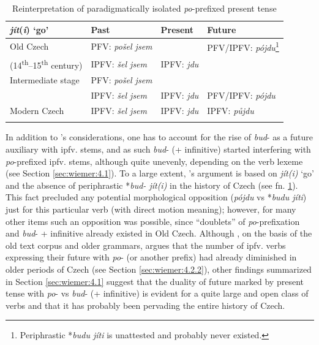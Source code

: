 \documentclass[output=paper,colorlinks,citecolor=brown]{langscibook}
\begin{document}
\begin{table}
\caption{Reinterpretation of paradigmatically isolated \textit{po}-prefixed present tense}
\label{tab:wiemer:2}
\begin{tabularx}{\textwidth}{p{3.1cm}Xp{1.9cm}p{3cm}}
\lsptoprule
\textit{jít}(\textit{i}) ‘go’ & {Past} & {Present} & {Future} \\
\midrule
Old Czech & PFV: \textit{pošel jsem} & \raisebox{3\height}{\rule{0.8cm}{0.25mm}} & PFV/IPFV: \textit{pójdu}\footnote{\label{fn:a} Periphrastic *\textit{budu jíti} is unattested and probably never existed.}\\
(14\textsuperscript{th}--15\textsuperscript{th} century) & IPFV: \textit{šel jsem} & IPFV: \textit{jdu} & \\
\midrule
{Intermediate stage} & PFV: \textit{pošel jsem} & \raisebox{3\height}{\rule{0.8cm}{0.25mm}} & \raisebox{3\height}{\rule{0.8cm}{0.25mm}}\\ 
& IPFV: \textit{šel jsem} & IPFV: \textit{jdu} & PFV/IPFV: \textit{pójdu}\\
\midrule
Modern Czech & IPFV: \textit{šel jsem} & IPFV: \textit{jdu} & IPFV: \textit{půjdu} \\
\lspbottomrule
\end{tabularx}
\end{table}


In addition to \citeauthor{Němec1958}’s considerations, one has to account for the rise of \textit{bud}- as a future auxiliary with ipfv. stems, and as such \textit{bud}- (+ infinitive) started interfering with \textit{po}-prefixed ipfv. stems, although quite unevenly, depending on the verb lexeme (see Section \ref{sec:wiemer:4.1}). To a large extent, \citeauthor{Němec1958}’s argument is based on \textit{jít(i)} ‘go’ and the absence of periphrastic *\textit{bud- jít(i)} in the history of Czech (see fn. \ref{fn:a}). This fact precluded any potential morphological opposition (\textit{pójdu} vs *\textit{budu jíti}) just for this particular verb (with direct motion meaning); however, for many other items such an opposition was possible, since “doublets” of \textit{po}-prefixation and \textit{bud}- + infinitive already existed in Old Czech. Although \citet[79--80, 102--103]{Šlosar1981}, on the basis of the old text corpus and older grammars, argues that the number of ipfv. verbs expressing their future with \textit{po}- (or another prefix) had already diminished in older periods of Czech (see Section \ref{sec:wiemer:4.2.2}), other findings summarized in Section \ref{sec:wiemer:4.1} suggest that the duality of future marked by present tense with \textit{po}- vs \textit{bud}- (+ infinitive) is evident for a quite large and open class of verbs and that it has probably been pervading the entire history of Czech.
\end{document}
